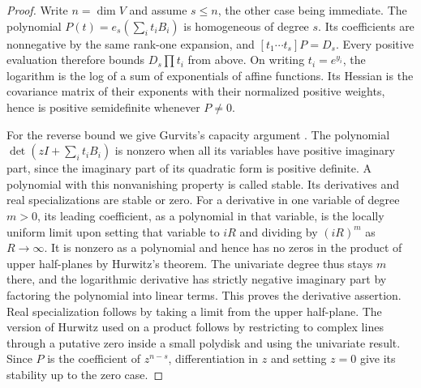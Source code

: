 \documentclass[a4paper,11pt]{article}
\theoremstyle{definition}
\theoremstyle{remark}
\numberwithin{equation}{section}
\begin{document}
\begin{proof}
Write \(n=\dim V\) and assume \(s\le n\), the other case being immediate.
The polynomial \(P(t)=e_s(\sum_i t_iB_i)\) is homogeneous of degree
\(s\). Its coefficients are nonnegative by the same rank-one
expansion, and \([t_1\cdots t_s]P=D_s\). Every positive evaluation
therefore bounds \(D_s\prod t_i\) from above. On writing
\(t_i=e^{y_i}\), the logarithm is the log of a sum of exponentials
of affine functions. Its Hessian is the covariance matrix of their
exponents with their normalized positive weights, hence is positive
semidefinite whenever \(P\ne0\).

For the reverse bound we give Gurvits's capacity argument
\cite{XXVI-XX-gurvits489}. The polynomial \(\det(zI+\sum_i t_iB_i)\) is nonzero
when all its variables have positive imaginary part, since the
imaginary part of its quadratic form is positive definite.
A polynomial with this nonvanishing property is called stable.
Its derivatives and real specializations are stable or zero. For
a derivative in one variable of degree \(m>0\), its leading
coefficient, as a polynomial in that variable, is the locally
uniform limit upon setting that variable to \(iR\) and dividing by
\((iR)^m\) as \(R\to\infty\). It is nonzero as a polynomial and
hence has no zeros in the product of upper half-planes by Hurwitz's
theorem. The univariate degree thus stays \(m\) there, and the
logarithmic derivative has strictly negative imaginary part by
factoring the polynomial into linear terms. This proves the derivative
assertion. Real specialization follows by taking a limit from the
upper half-plane. The version of Hurwitz used on a product follows
by restricting to complex lines through a putative zero inside a
small polydisk and using the univariate result. Since \(P\) is the
coefficient of \(z^{n-s}\), differentiation in \(z\) and setting
\(z=0\) give its stability up to the zero case.


\end{proof}
\end{document}
